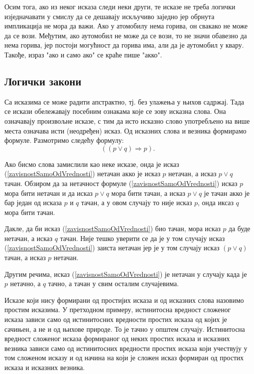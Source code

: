 \documentclass[a4paper]{book}
\newcommand{\tj}{\mbox{тј.} }
\begin{document}
Осим тога, ако из неког исказа следи неки други, те исказе не треба логички изје\-дна\-ча\-ва\-ти у смислу да се дешавају
искључиво заједно јер обрнута импликација не мора да важи. Ако у атомобилу нема горива, он свакако не може да се вози.
Међутим, ако аутомобил не може да се вози, то не значи обавезно
да нема горива, јер постоји могућност да горива има, али да је аутомобил у квару.
Такође, израз "ако и само ако" се краће пише "акко".

\subsection{Логички закони}

\indent

Са исказима се може радити апстрактно, \tj без улажења у њихов садржај. Тада се искази обележавају посебним ознакама које се
зову исказна слова. Она означавају произвољне исказе, с тим да исто исказно слово употребљено на више места означава
исти (неодређен) исказ. Од исказних слова и везника формирамо формуле. Размотримо следећу формулу:
\begin{equation}
\label{zavisnostSamoOdVrednosti}
((p\lor q)\Rightarrow p).
\end{equation}

Ако бисмо слова замислили као неке исказе, онда је исказ (\ref{zavisnostSamoOdVrednosti})
нетачан акко је исказ $p$ нетачан, а исказ $p\lor q$ тачан. Обзиром да за нетачност формуле
(\ref{zavisnostSamoOdVrednosti}) исказ $p$ мора бити нетачан и да исказ $p\lor q$
мора бити тачан, а исказ $p\lor q$ је тачан акко је бар један од исказа $p$ и $q$
тачан, а у овом случају то није исказ $p$, онда иксаз $q$ мора бити тачан.

Дакле, да би исказ (\ref{zavisnostSamoOdVrednosti}) био тачан, мора исказ $p$ да буде нетачан,
а исказ $q$ тачан. Није тешко уверити се да је у том случају исказ (\ref{zavisnostSamoOdVrednosti})
заиста нетачан јер је у том случају исказ $(p\lor q)$ тачан, а исказ $p$ нетачан.

Другим речима, исказ (\ref{zavisnostSamoOdVrednosti}) је нетачан у случају када је $p$ нетачно,
а $q$ тачно, а тачан у свим осталим случајевима.

Исказе који нису формирани од простијих исказа и од исказних слова назовимо простим исказима.
У претходном примеру, истинитосна вредност сложеног исказа зависи само од истинитосних вредности
простих исказа од којих је сачињен, а не и од њихове природе. То је тачно у општем случају.
Истинитосна вредност сложеног исказа формираног од неких простих исказа и исказних везника зависи
само од истинитосних вредности простих исказа који учествују у том сложеном исказу и од начина
на који је сложен исказ формиран од простих исказа и исказних везника.
\end{document}
